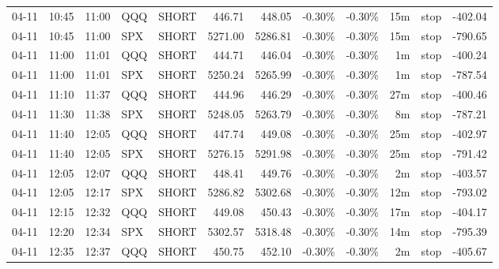 \documentclass[11pt,a4paper,twoside]{article}
\begin{document}
\begin{center}
\begin{longtable}{>{\color{txtmain}}l l l l l r r r r r >{\color{txtmain}}l r}
04-11 & 10:45 & 11:00 & QQQ & SHORT & 446.71 & 448.05 & \textcolor{lossred}{-0.30\%} & \textcolor{lossred}{-0.30\%} & 15m & stop & \textcolor{lossred}{-402.04} \\
04-11 & 10:45 & 11:00 & SPX & SHORT & 5271.00 & 5286.81 & \textcolor{lossred}{-0.30\%} & \textcolor{lossred}{-0.30\%} & 15m & stop & \textcolor{lossred}{-790.65} \\
04-11 & 11:00 & 11:01 & QQQ & SHORT & 444.71 & 446.04 & \textcolor{lossred}{-0.30\%} & \textcolor{lossred}{-0.30\%} & 1m & stop & \textcolor{lossred}{-400.24} \\
04-11 & 11:00 & 11:01 & SPX & SHORT & 5250.24 & 5265.99 & \textcolor{lossred}{-0.30\%} & \textcolor{lossred}{-0.30\%} & 1m & stop & \textcolor{lossred}{-787.54} \\
04-11 & 11:10 & 11:37 & QQQ & SHORT & 444.96 & 446.29 & \textcolor{lossred}{-0.30\%} & \textcolor{lossred}{-0.30\%} & 27m & stop & \textcolor{lossred}{-400.46} \\
04-11 & 11:30 & 11:38 & SPX & SHORT & 5248.05 & 5263.79 & \textcolor{lossred}{-0.30\%} & \textcolor{lossred}{-0.30\%} & 8m & stop & \textcolor{lossred}{-787.21} \\
04-11 & 11:40 & 12:05 & QQQ & SHORT & 447.74 & 449.08 & \textcolor{lossred}{-0.30\%} & \textcolor{lossred}{-0.30\%} & 25m & stop & \textcolor{lossred}{-402.97} \\
04-11 & 11:40 & 12:05 & SPX & SHORT & 5276.15 & 5291.98 & \textcolor{lossred}{-0.30\%} & \textcolor{lossred}{-0.30\%} & 25m & stop & \textcolor{lossred}{-791.42} \\
04-11 & 12:05 & 12:07 & QQQ & SHORT & 448.41 & 449.76 & \textcolor{lossred}{-0.30\%} & \textcolor{lossred}{-0.30\%} & 2m & stop & \textcolor{lossred}{-403.57} \\
04-11 & 12:05 & 12:17 & SPX & SHORT & 5286.82 & 5302.68 & \textcolor{lossred}{-0.30\%} & \textcolor{lossred}{-0.30\%} & 12m & stop & \textcolor{lossred}{-793.02} \\
04-11 & 12:15 & 12:32 & QQQ & SHORT & 449.08 & 450.43 & \textcolor{lossred}{-0.30\%} & \textcolor{lossred}{-0.30\%} & 17m & stop & \textcolor{lossred}{-404.17} \\
04-11 & 12:20 & 12:34 & SPX & SHORT & 5302.57 & 5318.48 & \textcolor{lossred}{-0.30\%} & \textcolor{lossred}{-0.30\%} & 14m & stop & \textcolor{lossred}{-795.39} \\
04-11 & 12:35 & 12:37 & QQQ & SHORT & 450.75 & 452.10 & \textcolor{lossred}{-0.30\%} & \textcolor{lossred}{-0.30\%} & 2m & stop & \textcolor{lossred}{-405.67} \\

\end{longtable}
\end{center}
\end{document}
